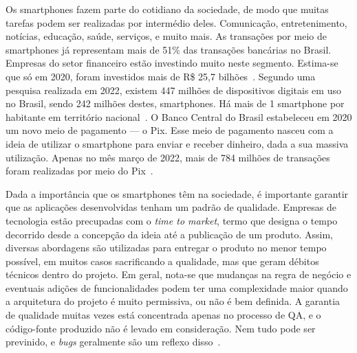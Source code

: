 Os smartphones fazem parte do cotidiano da sociedade, de modo que muitas tarefas podem ser realizadas por intermédio deles.
Comunicação, entretenimento, notícias, educação, saúde, serviços, e muito mais.
As transações por meio de smartphones já representam mais de 51\% das transações bancárias no Brasil.
Empresas do setor financeiro estão investindo muito neste segmento.
Estima-se que só em 2020, foram investidos mais de R\$ 25,7 bilhões~\cite{febraban-data}.
Segundo uma pesquisa realizada em 2022, existem 447 milhões de dispositivos digitais em uso no Brasil, sendo 242 milhões destes, smartphones.
Há mais de 1 smartphone por habitante em território nacional~\cite{it-usage-data}.
O Banco Central do Brasil estabeleceu em 2020 um novo meio de pagamento — o Pix.
Esse meio de pagamento nasceu com a ideia de utilizar o smartphone para enviar e receber dinheiro, dada a sua massiva utilização.
Apenas no mês março de 2022, mais de 784 milhões de transações foram realizadas por meio do Pix~\cite{pix-statistics}.

Dada a importância que os smartphones têm na sociedade, é importante garantir que as aplicações desenvolvidas tenham um padrão de qualidade.
Empresas de tecnologia estão precupadas com o \emph{time to market}, termo que designa o tempo decorrido desde a concepção da ideia até a publicação de um produto.
Assim, diversas abordagens são utilizadas para entregar o produto no menor tempo possível, em muitos casos sacrificando a qualidade, mas que geram débitos técnicos dentro do projeto.
Em geral, nota-se que mudanças na regra de negócio e eventuais adições de funcionalidades podem ter uma complexidade maior quando a arquitetura do projeto é muito permissiva, ou não é bem definida.
A garantia de qualidade muitas vezes está concentrada apenas no processo de QA, e o código-fonte produzido não é levado em consideração.
Nem tudo pode ser previnido, e \emph{bugs} geralmente são um reflexo disso~\cite{quality-standards-paper}.